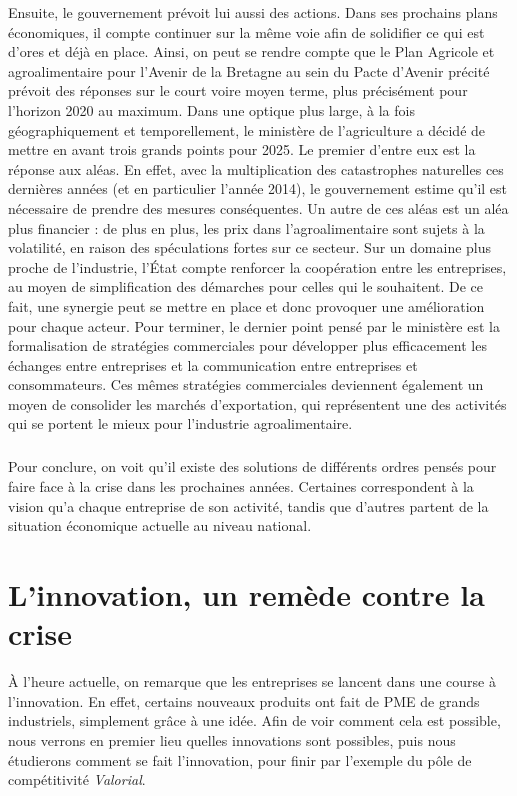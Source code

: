 \documentclass[a4paper,12pt]{report}
\begin{document}
			Ensuite, le gouvernement prévoit lui aussi des actions. Dans ses prochains plans économiques, il compte continuer sur la même voie afin de solidifier ce qui est d’ores et déjà en place. Ainsi, on peut se rendre compte que le Plan Agricole et agroalimentaire pour l’Avenir de la Bretagne au sein du Pacte d’Avenir précité prévoit des réponses sur le court voire moyen terme, plus précisément pour l’horizon 2020 au maximum\cite{PacteAvenirBretagne}. Dans une optique plus large, à la fois géographiquement et temporellement, le ministère de l’agriculture a décidé de mettre en avant trois grands points  pour 2025\cite{AvenirFiliereAgricole2025}. Le premier d’entre eux est la réponse aux aléas. En effet, avec la multiplication des catastrophes naturelles ces dernières années (et en particulier l’année 2014), le gouvernement estime qu'il est nécessaire de prendre des mesures conséquentes. Un autre de ces aléas est un aléa plus financier : de plus en plus, les prix dans l’agroalimentaire sont sujets à la volatilité, en raison des spéculations fortes sur ce secteur. Sur un domaine plus proche de l’industrie, l’État compte renforcer la coopération entre les entreprises, au moyen de simplification des démarches pour celles qui le souhaitent. De ce fait, une synergie peut se mettre en place et donc provoquer une amélioration pour chaque acteur. Pour terminer, le dernier point pensé par le ministère est la formalisation de stratégies commerciales pour développer plus efficacement les échanges entre entreprises et la communication entre entreprises et consommateurs. Ces mêmes stratégies commerciales deviennent également un moyen de consolider les marchés d’exportation, qui représentent une des activités qui se portent le mieux pour l’industrie agroalimentaire.
			
			\paragraph{}Pour conclure, on voit qu’il existe des solutions de différents ordres pensés pour faire face à la crise dans les prochaines années. Certaines correspondent à la vision qu’a chaque entreprise de son activité, tandis que d’autres partent de la situation économique actuelle au niveau national.
			
\chapter{L'innovation, un remède contre la crise}
	À l'heure actuelle, on remarque que les entreprises se lancent dans une course à l'innovation. En effet, certains nouveaux produits ont fait de PME de grands industriels, simplement grâce à une idée. Afin de voir comment cela est possible, nous verrons en premier lieu quelles innovations sont possibles, puis nous étudierons comment se fait l'innovation, pour finir par l'exemple du pôle de compétitivité \textit{Valorial}.
	
\end{document}

